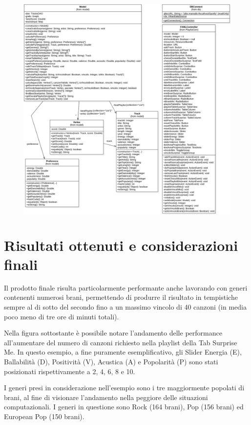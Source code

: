 \documentclass[12pt, a4paper]{article}
\begin{document}
\begin{figure}[h]
  \centering
  \includegraphics[scale=0.50]{images/diagram}
\end{figure}

\newpage
\section{Risultati ottenuti e considerazioni finali}

Il prodotto finale risulta particolarmente performante anche lavorando con generi contenenti numerosi brani, permettendo di produrre il risultato in tempistiche sempre al di sotto del secondo fino a un massimo vincolo di 40 canzoni (in media poco meno di tre ore di minuti totali).

Nella figura sottostante è possibile notare l'andamento delle performance all'aumentare del numero di canzoni richiesto nella playlist della Tab Surprise Me. In questo esempio, a fine puramente esemplificativo, gli Slider Energia (E), Ballabilità (D), Positività (V), Acustica (A) e Popolarità (P) sono stati posizionati rispettivamente a 2, 4, 6, 8 e 10. \par  
I generi presi in considerazione nell'esempio sono i tre maggiormente popolati di brani, al fine di visionare l'andamento nella peggiore delle situazioni computazionali. I generi in questione sono Rock (164 brani), Pop (156 brani) ed European Pop (150 brani).
\end{document}
